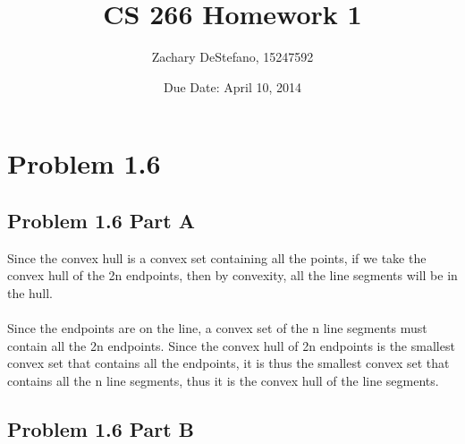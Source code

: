 \documentclass[11pt,psfig]{article}
\begin{document}
\setlength{\parskip}{1.2ex plus0.3ex minus 0.3ex}


\thispagestyle{empty} \pagestyle{myheadings} 



\title{CS 266 Homework 1}
\author{Zachary DeStefano, 15247592}
\date{Due Date: April 10, 2014}

\maketitle

\vfill\eject

\section*{Problem 1.6}

\subsection*{Problem 1.6 Part A}

Since the convex hull is a convex set containing all the points, if we take the convex hull of the 2n endpoints, then by convexity, all the line segments will be in the hull. 
\\
\\
Since the endpoints are on the line, a convex set of the n line segments must contain all the 2n endpoints. Since the convex hull of 2n endpoints is the smallest convex set that contains all the endpoints, it is thus the smallest convex set that contains all the n line segments, thus it is the convex hull of the line segments. 

\subsection*{Problem 1.6 Part B}
\end{document}
